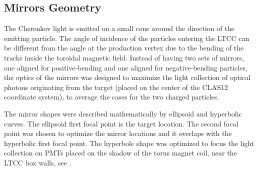 \subsection{Mirrors Geometry}

The Cherenkov light is emitted on a small cone around the direction of the emitting particle. The angle of
incidence of the particles entering the LTCC can be different from the angle at the production vertex due to the bending of the tracks
inside the toroidal magnetic field. Instead of having two sets of mirrors, one aligned for positive-bending and one aligned for negative-bending particles,
the optics of the mirrors was designed to maximize the light collection of optical photons originating from the target (placed on the center of the CLAS12 coordinate system),
to average the cases for the two charged particles.

The mirror shapes were described mathematically by ellipsoid and hyperbolic curves.
The ellipsoid first focal point is the target location. The second focal point was chosen
to optimize the mirror locations and it overlaps with the hyperbolic first focal point. The hyperbole shape was optimized to focus the light
collection on PMTs placed on the shadow of the torus magnet coil, near the LTCC box walls, see .



